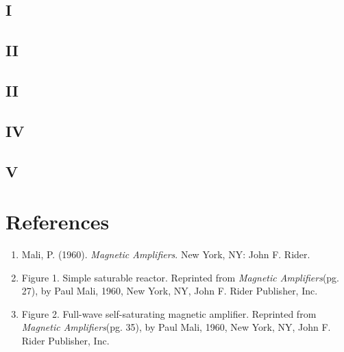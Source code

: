\documentclass[11pt]{article}
\begin{document}
\subsection{I}
\subsection{II}
\subsection{II}
\subsection{IV}
\subsection{V}	

\pagebreak

\section{References}
\begin{enumerate}
\item Mali, P. (1960).\textit{ Magnetic Amplifiers}. New York, NY: John F. Rider.
\item Figure 1. Simple saturable reactor. Reprinted from \textit{Magnetic Amplifiers}(pg. 27), by Paul Mali, 1960, New York, NY, John F. Rider Publisher, Inc.
\item Figure 2. Full-wave self-saturating magnetic amplifier. Reprinted from \textit{Magnetic Amplifiers}(pg. 35), by Paul Mali, 1960, New York, NY, John F. Rider Publisher, Inc.
\end{enumerate}	
\end{document}
